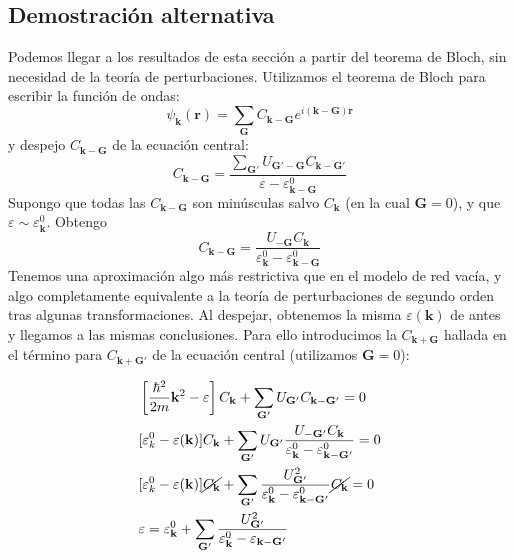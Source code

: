 \subsection{Demostración alternativa}
Podemos llegar a los resultados de esta sección a partir del teorema
de Bloch, sin necesidad de la teoría de perturbaciones. Utilizamos el
teorema de Bloch para escribir la función de ondas:
\begin{equation}
  \psi_\mathbf{k}(\mathbf{r}) = \sum_{\mathbf{G}}
  C_{\mathbf{k}-\mathbf{G}} e^{i(\mathbf{k}-\mathbf{G})\mathbf{r}}
\end{equation}
y despejo $C_{\mathbf{k}-\mathbf{G}}$ de la ecuación central:
\begin{equation}
  C_{\mathbf{k
    }-\mathbf{G}} = \frac{\sum_{\mathbf{G'}}
    U_{\mathbf{G'}-\mathbf{G}} C_{\mathbf{k} - \mathbf{G'}}}{\varepsilon - \varepsilon_{\mathbf{k}-\mathbf{G}}^0}
\end{equation}
Supongo que todas las $C_{\mathbf{k}-\mathbf{G}}$ son minúsculas salvo
$C_\mathbf{k}$ (en la cual $\mathbf{G}=0$), y que $\varepsilon \sim
\varepsilon_\mathbf{k}^0$. Obtengo
\begin{equation}
  C_{\mathbf{k}-\mathbf{G}} =
  \frac{U_\mathbf{-G}C_\mathbf{k}}{\varepsilon_\mathbf{k}^0 - \varepsilon^0_{\mathbf{k}-\mathbf{G}}}
\end{equation}
Tenemos una aproximación algo más restrictiva que en el modelo de red
vacía, y algo completamente equivalente a la teoría de perturbaciones
de segundo orden tras algunas transformaciones. Al despejar, obtenemos
la misma $\varepsilon(\mathbf{k})$ de antes y llegamos a las mismas
conclusiones. Para ello introducimos la $C_{\mathbf{k}+\mathbf{G}}$ hallada
en el término para $C_{\mathbf{k}+\mathbf{G}'}$ de la ecuación central
(utilizamos $\mathbf{G}=0$):

\begin{equation}
  \begin{split}
    &\left[ \frac{\hbar^2}{2m} \mathbf{k}^2 - \varepsilon
    \right] C_{\mathbf{k}} + \sum_{\mathbf{G'}}
    U_{\mathbf{G'}} C_{\mathbf{k}-\mathbf{G'}} = 0 \\
    &[\varepsilon_k^0 - \varepsilon(\mathbf{k})]C_\mathbf{k} +
    \sum_{\mathbf{G}'} U_\mathbf{G'} \frac{U_{-\mathbf{G'}}
      C_\mathbf{k}}{\varepsilon_\mathbf{k}^0 -
      \varepsilon_{\mathbf{k}-\mathbf{G'}}^0} = 0 \\
    &[\varepsilon_k^0 - \varepsilon(\mathbf{k})] \cancel{C_\mathbf{k}}+
    \sum_{\mathbf{G}'} \frac{U_{\mathbf{G'}}^2
      }{\varepsilon_\mathbf{k}^0 -
      \varepsilon_{\mathbf{k}-\mathbf{G'}}^0} \cancel{C_\mathbf{k}} = 0 \\
    &\varepsilon = \varepsilon_\mathbf{k}^0 + \sum_{\mathbf{G'}}
    \frac{U_\mathbf{G'}^2}{\varepsilon_\mathbf{k}^0 -
      \varepsilon_{\mathbf{k}-\mathbf{G'}}} 
  \end{split}
\end{equation}


